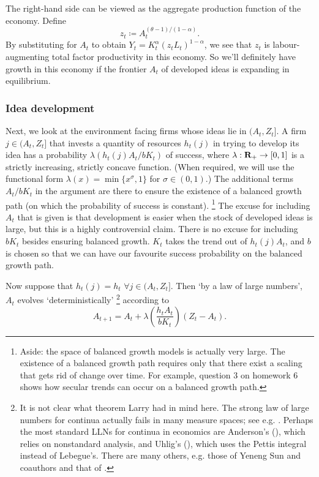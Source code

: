 \documentclass[11pt,letterpaper,reqno,oneside]{article}
\begin{document}
%
The right-hand side can be viewed as the aggregate production function of the economy. Define
%
\begin{equation*}
	z_t \coloneqq A_t^{(\theta-1)/(1-\alpha)} .
\end{equation*}
%
By substituting for $A_t$ to obtain $Y_t = K_t^\alpha ( z_t L_t )^{1-\alpha}$, we see that $z_t$ is labour-augmenting total factor productivity in this economy. So we'll definitely have growth in this economy if the frontier $A_t$ of developed ideas is expanding in equilibrium.



\subsubsection{Idea development}
\label{sec:11Nov2015:comin_gertler:idea_development}

Next, we look at the environment facing firms whose ideas lie in $(A_t,Z_t]$. A firm $j \in (A_t,Z_t]$ that invests a quantity of resources $h_t(j)$ in trying to develop its idea has a probability $\lambda( h_t(j) A_t / b K_t )$ of success, where $\lambda : \mathbf{R}_+ \to [0,1]$ is a strictly increasing, strictly concave function. (When required, we will use the functional form $\lambda(x) = \min\{x^\sigma,1\}$ for $\sigma \in (0,1)$.) The additional terms $A_t / b K_t$ in the argument are there to ensure the existence of a balanced growth path (on which the probability of success is constant).%
	\footnote{Aside: the space of balanced growth models is actually very large. The existence of a balanced growth path requires only that there exist a scaling that gets rid of change over time. For example, question 3 on homework 6 shows how secular trends can occur on a balanced growth path.}
The excuse for including $A_t$ that is given is that development is easier when the stock of developed ideas is large, but this is a highly controversial claim. There is no excuse for including $b K_t$ besides ensuring balanced growth. $K_t$ takes the trend out of $h_t(j) A_t$, and $b$ is chosen so that we can have our favourite success probability on the balanced growth path.

Now suppose that $h_t(j) = h_t$ $\forall j \in (A_t,Z_t]$. Then `by a law of large numbers',
$A_t$ evolves `deterministically'%
	\footnote{It is not clear what theorem Larry had in mind here. The strong law of large numbers for continua actually fails in many measure spaces; see e.g. \textcite{Judd1985}. Perhaps the most standard LLNs for continua in economics are Anderson's (\citeyear{Anderson1991}), which relies on nonstandard analysis, and Uhlig's (\citeyear{Uhlig1996}), which uses the Pettis integral instead of Lebegue's. There are many others, e.g. those of Yeneng Sun and coauthors \parencite{Sun2006,SunZhang2009,DuffieSun2012,HeSunSun2016} and that of \textcite{Green1994}.\label{footnote:LLN}}
according to
%
\begin{equation*}
	A_{t+1} = A_t + \lambda\left( \frac{h_t A_t}{b K_t} \right) (Z_t-A_t) .
\end{equation*}
\end{document}
